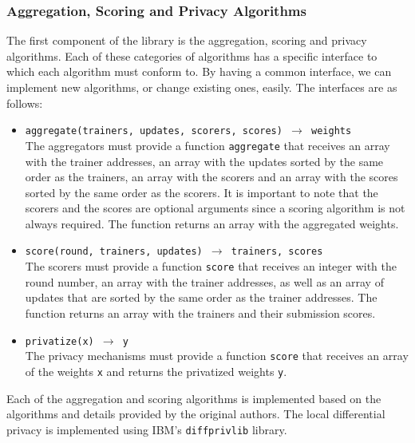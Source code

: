 \subsubsection{Aggregation, Scoring and Privacy Algorithms}

The first component of the library is the aggregation, scoring and privacy algorithms. Each of these categories of algorithms has a specific interface to which each algorithm must conform to. By having a common interface, we can implement new algorithms, or change existing ones, easily. The interfaces are as follows:

\begin{itemize}
    \item \texttt{aggregate(trainers, updates, scorers, scores) $\rightarrow$ weights}\\
    The aggregators must provide a function \texttt{aggregate} that receives an array with the trainer addresses, an array with the updates sorted by the same order as the trainers, an array with the scorers and an array with the scores sorted by the same order as the scorers. It is important to note that the scorers and the scores are optional arguments since a scoring algorithm is not always required. The function returns an array with the aggregated weights. %
    
    \item \texttt{score(round, trainers, updates) $\rightarrow$ trainers, scores}\\
    The scorers must provide a function \texttt{score} that receives an integer with the round number, an array with the trainer addresses, as well as an array of updates that are sorted by the same order as the trainer addresses. The function returns an array with the trainers and their submission scores. %
    
    \item \texttt{privatize(x) $\rightarrow$ y}\\
    The privacy mechanisms must provide a function \texttt{score} that receives an array of the weights \texttt{x} and returns the privatized weights \texttt{y}. %
\end{itemize}

Each of the aggregation and scoring algorithms is implemented based on the algorithms and details provided by the original authors. The local differential privacy is implemented using IBM's \texttt{diffprivlib} \cite{diffprivlib} library.

